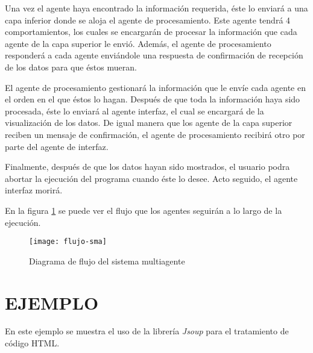 \documentclass{pre-tfg}
\begin{document}
Una vez el agente haya encontrado la información requerida, éste lo enviará a una capa inferior donde se aloja el agente de procesamiento. Este agente tendrá 4 comportamientos, los cuales se encargarán de procesar la información que cada agente de la capa superior le envió. Además, el agente de procesamiento responderá a cada agente enviándole una respuesta de confirmación de recepción de los datos para que éstos mueran.

El agente de procesamiento gestionará la información que le envíe cada agente en el orden en el que éstos lo hagan. Después de que toda la información haya sido procesada, éste lo enviará al agente interfaz, el cual se encargará de la visualización de los datos. De igual manera que los agente de la capa superior reciben un mensaje de confirmación, el agente de procesamiento recibirá otro por parte del agente de interfaz. 

Finalmente, después de que los datos hayan sido mostrados, el usuario podra abortar la ejecución del programa cuando éste lo desee. Acto seguido, el agente interfaz morirá.

En la figura \ref{fig:flujo-sma} se puede ver el flujo que los agentes seguirán a lo largo de la ejecución.

\begin{figure}[h]
    \centering
    \texttt{[image: flujo-sma]}
    \caption{Diagrama de flujo del sistema multiagente}
    \label{fig:flujo-sma}
\end{figure}

\section{EJEMPLO}

En este ejemplo se muestra el uso de la librería \textit{Jsoup} para el tratamiento de código HTML.
\end{document}

